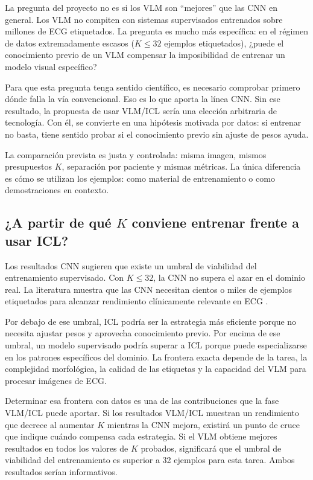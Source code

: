 La pregunta del proyecto no es si los VLM son ``mejores'' que las CNN en general. Los VLM no compiten con sistemas supervisados entrenados sobre millones de ECG etiquetados. La pregunta es mucho más específica: en el régimen de datos extremadamente escasos (\(K \leq 32\) ejemplos etiquetados), ¿puede el conocimiento previo de un VLM compensar la imposibilidad de entrenar un modelo visual específico?

Para que esta pregunta tenga sentido científico, es necesario comprobar primero dónde falla la vía convencional. Eso es lo que aporta la línea CNN. Sin ese resultado, la propuesta de usar VLM/ICL sería una elección arbitraria de tecnología. Con él, se convierte en una hipótesis motivada por datos: si entrenar no basta, tiene sentido probar si el conocimiento previo sin ajuste de pesos ayuda.

La comparación prevista es justa y controlada: misma imagen, mismos presupuestos \(K\), separación por paciente y mismas métricas. La única diferencia es cómo se utilizan los ejemplos: como material de entrenamiento o como demostraciones en contexto.

\subsection{\texorpdfstring{¿A partir de qué \(K\) conviene entrenar frente a usar ICL?}{A partir de que K conviene entrenar frente a usar ICL?}}

Los resultados CNN sugieren que existe un umbral de viabilidad del entrenamiento supervisado. Con \(K \leq 32\), la CNN no supera el azar en el dominio real. La literatura muestra que las CNN necesitan cientos o miles de ejemplos etiquetados para alcanzar rendimiento clínicamente relevante en ECG \cite{sangha2022,ribeiro2020}.

Por debajo de ese umbral, ICL podría ser la estrategia más eficiente porque no necesita ajustar pesos y aprovecha conocimiento previo. Por encima de ese umbral, un modelo supervisado podría superar a ICL porque puede especializarse en los patrones específicos del dominio. La frontera exacta depende de la tarea, la complejidad morfológica, la calidad de las etiquetas y la capacidad del VLM para procesar imágenes de ECG.

Determinar esa frontera con datos es una de las contribuciones que la fase VLM/ICL puede aportar. Si los resultados VLM/ICL muestran un rendimiento que decrece al aumentar \(K\) mientras la CNN mejora, existirá un punto de cruce que indique cuándo compensa cada estrategia. Si el VLM obtiene mejores resultados en todos los valores de \(K\) probados, significará que el umbral de viabilidad del entrenamiento es superior a 32 ejemplos para esta tarea. Ambos resultados serían informativos.

